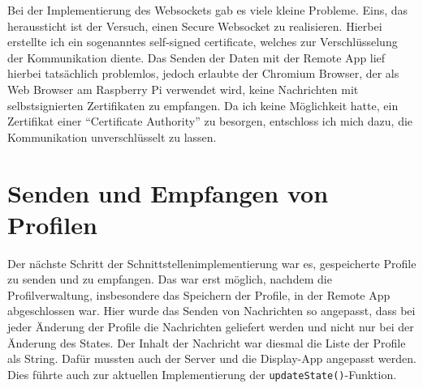 Bei der Implementierung des Websockets gab es viele kleine Probleme. Eins, das heraussticht ist der Versuch, einen Secure Websocket zu realisieren. Hierbei erstellte ich ein sogenanntes self-signed certificate, welches zur Verschlüsselung der Kommunikation diente. Das Senden der Daten mit der Remote App lief hierbei tatsächlich problemlos, jedoch erlaubte der Chromium Browser, der als Web Browser am Raspberry Pi verwendet wird, keine Nachrichten mit selbstsignierten Zertifikaten zu empfangen. Da ich keine Möglichkeit hatte, ein Zertifikat einer \enquote{Certificate Authority} zu besorgen, entschloss ich mich dazu, die Kommunikation unverschlüsselt zu lassen.

\section{Senden und Empfangen von Profilen}
Der nächste Schritt der Schnittstellenimplementierung war es, gespeicherte Profile zu senden und zu empfangen. Das war erst möglich, nachdem die Profilverwaltung, insbesondere das Speichern der Profile, in der Remote App abgeschlossen war. Hier wurde das Senden von Nachrichten so angepasst, dass bei jeder Änderung der Profile die Nachrichten geliefert werden und nicht nur bei der Änderung des States. Der Inhalt der Nachricht war diesmal die Liste der Profile als String. Dafür mussten auch der Server und die Display-App angepasst werden. Dies führte auch zur aktuellen Implementierung der \texttt{updateState()}-Funktion.

